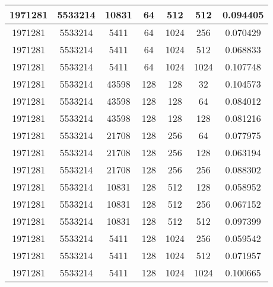 \documentclass[9pt]{article}
\begin{document}
\begin{tabular}{|c|c|c|c|c|c|c| }
\hline
1971281  & 5533214  & 10831  & 64  & 512  & 512  & 0.094405 \\
\hline
1971281  & 5533214  & 5411  & 64  & 1024  & 256  & 0.070429 \\
\hline
1971281  & 5533214  & 5411  & 64  & 1024  & 512  & 0.068833 \\
\hline
1971281  & 5533214  & 5411  & 64  & 1024  & 1024  & 0.107748 \\
\hline
1971281  & 5533214  & 43598  & 128  & 128  & 32  & 0.104573 \\
\hline
1971281  & 5533214  & 43598  & 128  & 128  & 64  & 0.084012 \\
\hline
1971281  & 5533214  & 43598  & 128  & 128  & 128  & 0.081216 \\
\hline
1971281  & 5533214  & 21708  & 128  & 256  & 64  & 0.077975 \\
\hline
1971281  & 5533214  & 21708  & 128  & 256  & 128  & 0.063194 \\
\hline
1971281  & 5533214  & 21708  & 128  & 256  & 256  & 0.088302 \\
\hline
1971281  & 5533214  & 10831  & 128  & 512  & 128  & 0.058952 \\
\hline
1971281  & 5533214  & 10831  & 128  & 512  & 256  & 0.067152 \\
\hline
1971281  & 5533214  & 10831  & 128  & 512  & 512  & 0.097399 \\
\hline
1971281  & 5533214  & 5411  & 128  & 1024  & 256  & 0.059542 \\
\hline
1971281  & 5533214  & 5411  & 128  & 1024  & 512  & 0.071957 \\
\hline
1971281  & 5533214  & 5411  & 128  & 1024  & 1024  & 0.100665 \\
\hline
\end{tabular}
 
\end{document}
